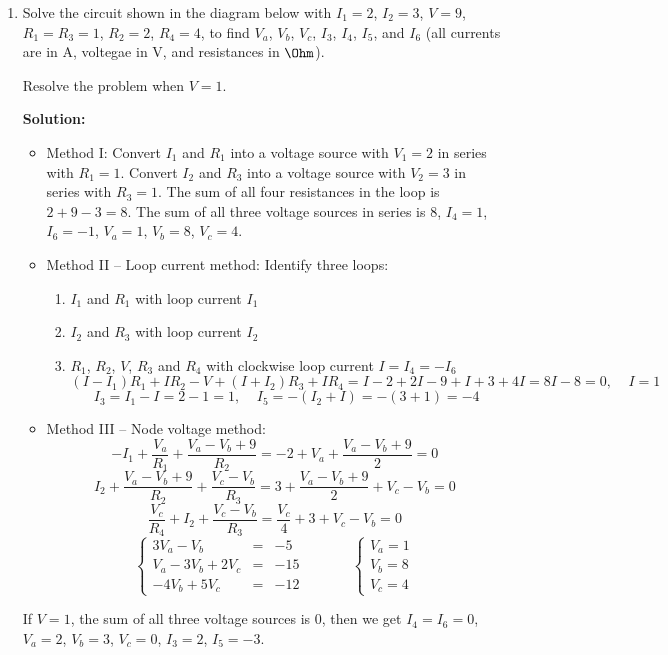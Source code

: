 \begin{enumerate}


\item Solve the circuit shown in the diagram below with $I_1=2$, $I_2=3$, 
  $V=9$, $R_1=R_3=1$, $R_2=2$, $R_4=4$, to find $V_a$, $V_b$, $V_c$, $I_3$, 
  $I_4$, $I_5$, and $I_6$ (all currents are in A, voltegae in V, and resistances
  in $\Ohm$).

  Resolve the problem when $V=1$.


  {\bf Solution:} 
  \begin{itemize}
  \item Method I: Convert $I_1$ and $R_1$ into a voltage source with
    $V_1=2$ in series with $R_1=1$. Convert $I_2$ and $R_3$ into a voltage 
    source with $V_2=3$ in series with $R_3=1$. The sum of all four resistances
    in the loop is $2+9-3=8$. The sum of all three voltage sources in series 
    is 8, $I_4=1$, $I_6=-1$, $V_a=1$, $V_b=8$, $V_c=4$.
  \item Method II -- Loop current method: Identify three loops:
    \begin{enumerate}
      \item $I_1$ and $R_1$ with loop current $I_1$
      \item $I_2$ and $R_3$ with loop current $I_2$
      \item $R_1$, $R_2$, $V$, $R_3$ and $R_4$ with clockwise loop current 
        $I=I_4=-I_6$ 
        \[
        (I-I_1)R_1+IR_2-V+(I+I_2)R_3+IR_4=I-2+2I-9+I+3+4I=8I-8=0,\;\;\;\;I=1
        \]
        \[
        I_3=I_1-I=2-1=1,\;\;\;\;I_5=-(I_2+I)=-(3+1)=-4
        \]
    \end{enumerate}
  \item Method III -- Node voltage method: 
      \[
      -I_1+\frac{V_a}{R_1}+\frac{V_a-V_b+9}{R_2}=-2+V_a+\frac{V_a-V_b+9}{2}=0
      \]
      \[
      I_2+\frac{V_a-V_b+9}{R_2}+\frac{V_c-V_b}{R_3}=3+\frac{V_a-V_b+9}{2}+V_c-V_b=0
      \]
      \[
      \frac{V_c}{R_4}+I_2+\frac{V_c-V_b}{R_3}=\frac{V_c}{4}+3+V_c-V_b=0
      \]
      \[
      \left\{\begin{array}{lll}
      3V_a-V_b&=&-5 \\
      V_a-3V_b+2V_c&=&-15\\
      -4V_b+5V_c&=&-12\end{array}\right.\;\;\;\;\;\;\;\;\;\;\;\;
      \left\{\begin{array}{l}
      V_a=1\\V_b=8\\V_c=4\end{array}\right.
      \]
  \end{itemize}
  If $V=1$, the sum of all three voltage sources is 0, then we get 
  $I_4=I_6=0$, $V_a=2$, $V_b=3$, $V_c=0$, $I_3=2$, $I_5=-3$.

\end{enumerate}


